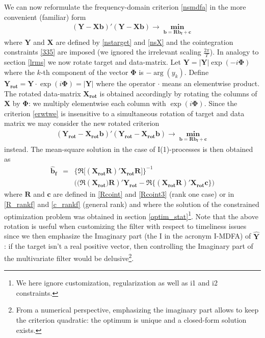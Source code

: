 \documentclass[11pt]{article}
\begin{document}
We can now reformulate the frequency-domain criterion \ref{nsmdfa} in the more convenient (familiar) form
\begin{eqnarray}\label{erwtwe}
\mathbf{(Y-Xb)'(Y-Xb)\to\min_{b=Rb_f+c}}
\end{eqnarray}
where $\mathbf{Y}$ and $\mathbf{X}$ are defined by  \ref{nstarget} and \ref{nsX} and the cointegration constraints \ref{335} are imposed (we ignored the irrelevant scaling  $\frac{2\pi}{T}$). In analogy to section \ref{lrms} we now rotate target and data-matrix. 
Let $\mathbf{Y}=|\mathbf{Y}|\exp(-i\mathbf{\Phi})$ where the $k$-th component of the vector $\mathbf{\Phi}$ is $-\arg(y_k)$. Define $\mathbf{Y_{rot}}=\mathbf{Y}\cdot\exp(i\mathbf{\Phi})=\mathbf{|Y|}$ where the operator $\cdot$ means an elementwise product. The rotated data-matrix $\mathbf{X_{rot}}$ is obtained accordingly by rotating the columns of $\mathbf{X}$ by $\mathbf{\Phi}$: we multiply elementwise each column with $\exp(i\mathbf{\Phi})$. Since the criterion \ref{erwtwe} is insensitive to a simultaneous rotation of target and data matrix we may consider the new rotated criterion 
\begin{eqnarray*}
\mathbf{(Y_{rot}-X_{rot}b)'(Y_{rot}-X_{rot}b)\to\min_{b=Rb_f+c}}
\end{eqnarray*}
instead. 
The mean-square solution in the case of I(1)-processes is then obtained as
\begin{eqnarray}\label{nsbms}
\mathbf{\hat{b}_f}&=&\mathbf{\Big\{\Re\Big[(X_{\textrm{rot}}R)' X_{\textrm{rot}}R\Big]\Big\}}^{-1}\nonumber\\
&&\Big((\Re(\mathbf{X_{\textrm{rot}})R})'
\mathbf{Y_{\textrm{rot}}}-\Re\bigg\{(\mathbf{X_{\textrm{rot}}R})'\mathbf{X_{\textrm{rot}}c}\bigg\}\Big)\nonumber
\end{eqnarray}
where $\mathbf{R}$ and $\mathbf{c}$ are defined in \ref{Rcoint} and \ref{Rcoint3} (rank one case) or in \ref{R_rankf} and \ref{c_rankf} (general rank) and where the solution of the constrained optimization problem was obtained  in  section \ref{optim_stat}\footnote{We here ignore customization, regularization as well as i1 and i2 constraints.}. Note that the above rotation is useful when customizing the filter with respect to timeliness issues since we then emphasize the Imaginary part (the I in the acronym I-MDFA) of $\mathbf{\hat{Y}}$: if the target isn't a real positive vector, then controlling the Imaginary part of the multivariate filter would be delusive\footnote{From a numerical perspective, emphasizing the imaginary part allows to keep the criterion quadratic: the optimum is unique and a closed-form solution exists.}.
\end{document}
